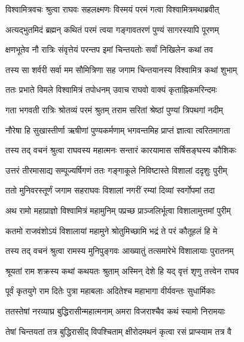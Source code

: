
\twolineshloka
{विश्वामित्रवचः श्रुत्वा राघवः सहलक्ष्मणः}
{विस्मयं परमं गत्वा विश्वामित्रमथाब्रवीत्} %

\twolineshloka
{अत्यद्भुतमिदं ब्रह्मन् कथितं परमं त्वया}
{गङ्गावतरणं पुण्यं सागरस्यापि पूरणम्} %

\twolineshloka
{क्षणभूतेव नौ रात्रिः संवृत्तेयं परन्तप}
{इमां चिन्तयतोः सर्वां निखिलेन कथां तव} %

\twolineshloka
{तस्य सा शर्वरी सर्वा मम सौमित्रिणा सह}
{जगाम चिन्तयानस्य विश्वामित्र कथां शुभाम्} %

\twolineshloka
{ततः प्रभाते विमले विश्वामित्रं तपोधनम्}
{उवाच राघवो वाक्यं कृताह्निकमरिन्दमः} %

\twolineshloka
{गता भगवती रात्रिः श्रोतव्यं परमं श्रुतम्}
{तराम सरितां श्रेष्ठां पुण्यां त्रिपथगां नदीम्} %

\twolineshloka
{नौरेषा हि सुखास्तीर्णा ऋषीणां पुण्यकर्मणाम्}
{भगवन्तमिह प्राप्तं ज्ञात्वा त्वरितमागता} %

\twolineshloka
{तस्य तद् वचनं श्रुत्वा राघवस्य महात्मनः}
{सन्तारं कारयामास सर्षिसङ्घस्य कौशिकः} %

\twolineshloka
{उत्तरं तीरमासाद्य सम्पूज्यर्षिगणं ततः}
{गङ्गाकूले निविष्टास्ते विशालां ददृशुः पुरीम्} %

\twolineshloka
{ततो मुनिवरस्तूर्णं जगाम सहराघवः}
{विशालां नगरीं रम्यां दिव्यां स्वर्गोपमां तदा} %

\twolineshloka
{अथ रामो महाप्राज्ञो विश्वामित्रं महामुनिम्}
{पप्रच्छ प्राञ्जलिर्भूत्वा विशालामुत्तमां पुरीम्} %

\twolineshloka
{कतमो राजवंशोऽयं विशालायां महामुने}
{श्रोतुमिच्छामि भद्रं ते परं कौतूहलं हि मे} %

\twolineshloka
{तस्य तद् वचनं श्रुत्वा रामस्य मुनिपुङ्गवः}
{आख्यातुं तत्समारेभे विशालायाः पुरातनम्} %

\twolineshloka
{श्रूयतां राम शक्रस्य कथां कथयतः श्रुताम्}
{अस्मिन् देशे हि यद् वृत्तं शृणु तत्त्वेन राघव} %

\twolineshloka
{पूर्वं कृतयुगे राम दितेः पुत्रा महाबलाः}
{अदितेश्च महाभागा वीर्यवन्तः सुधार्मिकाः} %

\twolineshloka
{ततस्तेषां नरव्याघ्र बुद्धिरासीन्महात्मनाम्}
{अमरा विजराश्चैव कथं स्यामो निरामयाः} %

\twolineshloka
{तेषां चिन्तयतां तत्र बुद्धिरासीद् विपश्चिताम्}
{क्षीरोदमथनं कृत्वा रसं प्राप्स्याम तत्र वै} %

